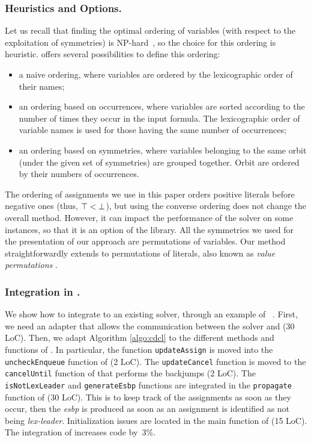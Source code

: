 \subsubsection{Heuristics and Options.} Let us recall that finding the optimal
ordering of variables (with respect to the exploitation of symmetries) is
NP-hard~\cite{luks.04.amai}, so the choice for this ordering is heuristic.
\libdsb{} offers several possibilities to define this ordering:
\begin{itemize}
 
 \item a naive ordering, where variables are ordered by the lexicographic
 order of their names;
 
 \item an ordering based on occurrences, where variables are sorted
 according to the number of times they occur in the input formula. The
 lexicographic order of variable names is used for those having the same number of
 occurrences;
 
 \item an ordering based on symmetries, where variables belonging to the
 same orbit (under the given set of symmetries) are grouped together. Orbit are
 ordered by their numbers of occurrences.
 
\end{itemize}
The ordering of assignments we use in this paper orders positive literals
before negative ones (thus, $\top < \bot$), but using the converse
ordering does not change the overall method. However, it can impact the
performance of the solver on some instances, so that it is an option of the
library.
All the symmetries we used for the presentation of our approach are
permutations of variables. Our method straightforwardly extends to permutations of literals, also known as \emph{value permutations} \cite{biere2009handbook}.


\subsubsection{Integration in \minisat{}.} We show how to integrate \libdsb{}
to an existing solver, through an example of \minisat{}~\cite{een2003extensible}.
First, we need an adapter that allows the communication between the solver and
\libdsb{} (30 LoC). Then, we adapt Algorithm \ref{algo:cdcl} to the different
methods and functions of \minisat{}. In particular, the function
\texttt{updateAssign} is moved into the \texttt{uncheckEnqueue} function of
\minisat{} (2 LoC). The \texttt{updateCancel} function is moved to the
\texttt{cancelUntil} function of \minisat{} that performs the backjumps (2
LoC). The \texttt{isNotLexLeader} and \texttt{generateEsbp} functions are
integrated in the \texttt{propagate} function of \minisat{} (30 LoC). This is
to keep track of the assignments as soon as they occur, then the
\textit{esbp} is produced as soon as an assignment is identified as not being
\emph{lex-leader}. Initialization issues are located in the main function of
\minisat (15 LoC).
The integration of \libdsb{} increases \minisat{} code by~3\%.
 
